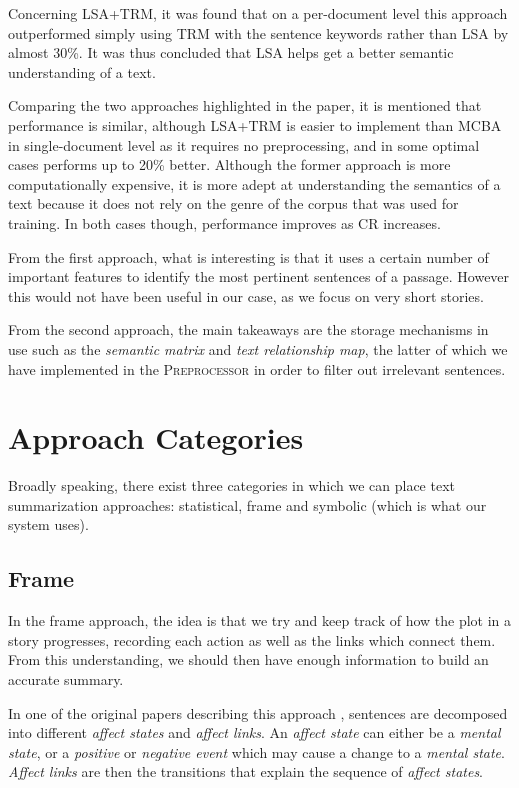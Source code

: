 Concerning LSA+TRM, it was found that on a per-document level this approach outperformed simply using TRM with the sentence keywords rather than LSA by almost 30\%. It was thus concluded that LSA helps get a better semantic understanding of a text.

Comparing the two approaches highlighted in the paper, it is mentioned that performance is similar, although LSA+TRM is easier to implement than MCBA in single-document level as it requires no preprocessing, and in some optimal cases performs up to 20\% better. Although the former approach is more computationally expensive, it is more adept at understanding the semantics of a text because it does not rely on the genre of the corpus that was used for training. In both cases though, performance improves as CR increases.

\mbox{}

From the first approach, what is interesting is that it uses a certain number of important features to identify the most pertinent sentences of a passage. However this would not have been useful in our case, as we focus on very short stories.

From the second approach, the main takeaways are the storage mechanisms in use such as the \textit{semantic matrix} and \textit{text relationship map}, the latter of which we have implemented in the \textsc{Preprocessor} in order to filter out irrelevant sentences.

\section{Approach Categories}
\label{sec:approach_categories}

Broadly speaking, there exist three categories in which we can place text summarization approaches: statistical, frame and symbolic (which is what our system uses).

\subsection{Frame}

In the frame approach, the idea is that we try and keep track of how the plot in a story progresses, recording each action as well as the links which connect them. From this understanding, we should then have enough information to build an accurate summary.

\mbox{}

In one of the original papers describing this approach \cite{lehnert_1980_nodate}, sentences are decomposed into different \textit{affect states} and \textit{affect links}. An \textit{affect state} can either be a \textit{mental state}, or a \textit{positive} or \textit{negative event} which may cause a change to a \textit{mental state}. \textit{Affect links} are then the transitions that explain the sequence of \textit{affect states}.

